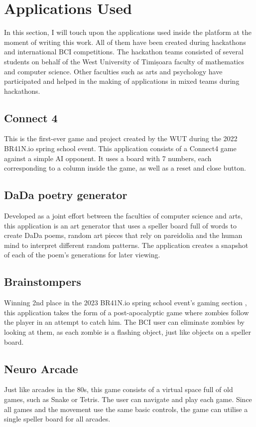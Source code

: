 \newpage

\section{Applications Used} \label{sect:Applications Used}
In this section, I will touch upon the applications used inside the platform at the moment of writing this work. All of them have been created during hackathons and international BCI competitions. The hackathon teams consisted of several students on behalf of the West University of Timișoara faculty of mathematics and computer science. Other faculties such as arts and psychology have participated and helped in the making of applications in mixed teams during hackathons.

\subsection{Connect 4}
This is the first-ever game and project created by the WUT during the 2022 BR41N.io spring school event. This application consists of a Connect4 game against a simple AI opponent. It uses a board with 7 numbers, each corresponding to a column inside the game, as well as a reset and close button. 

\subsection{DaDa poetry generator}
Developed as a joint effort between the faculties of computer science and arts, this application is an art generator that uses a speller board full of words to create DaDa poems, random art pieces that rely on pareidolia and the human mind to interpret different random patterns. The application creates a snapshot of each of the poem's generations for later viewing.

\subsection{Brainstompers}
Winning 2nd place in the 2023 BR41N.io spring school event's gaming section \cite{spring-school_2023}, this application takes the form of a post-apocalyptic game where zombies follow the player in an attempt to catch him. The BCI user can eliminate zombies by looking at them, as each zombie is a flashing object, just like objects on a speller board.

\subsection{Neuro Arcade}
Just like arcades in the 80s, this game consists of a virtual space full of old games, such as Snake or Tetris. The user can navigate and play each game. Since all games and the movement use the same basic controls, the game can utilise a single speller board for all arcades.

